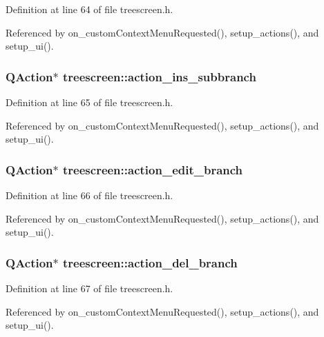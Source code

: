 Definition at line 64 of file treescreen.h.

Referenced by on\_\-custom\-Context\-Menu\-Requested(), setup\_\-actions(), and setup\_\-ui().
\subsubsection{\setlength{\rightskip}{0pt plus 5cm}QAction$\ast$ {\bf treescreen::action\_\-ins\_\-subbranch}\hspace{0.3cm}{\tt  [private]}}\label{classtreescreen_90bf91aa0d3b10da86514f53d8b826b1}




Definition at line 65 of file treescreen.h.

Referenced by on\_\-custom\-Context\-Menu\-Requested(), setup\_\-actions(), and setup\_\-ui().
\subsubsection{\setlength{\rightskip}{0pt plus 5cm}QAction$\ast$ {\bf treescreen::action\_\-edit\_\-branch}\hspace{0.3cm}{\tt  [private]}}\label{classtreescreen_5b276116c7d715ff363b3ff93279e26d}




Definition at line 66 of file treescreen.h.

Referenced by on\_\-custom\-Context\-Menu\-Requested(), setup\_\-actions(), and setup\_\-ui().
\subsubsection{\setlength{\rightskip}{0pt plus 5cm}QAction$\ast$ {\bf treescreen::action\_\-del\_\-branch}\hspace{0.3cm}{\tt  [private]}}\label{classtreescreen_723ef6926d4df31046a826ba3463546c}




Definition at line 67 of file treescreen.h.

Referenced by on\_\-custom\-Context\-Menu\-Requested(), setup\_\-actions(), and setup\_\-ui().

